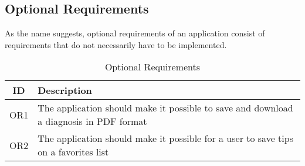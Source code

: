 \subsection{Optional Requirements}
As the name suggests, optional requirements of an application consist of requirements that do not necessarily have to be implemented.
\begin{table}[H]
	\begin{center}
		\scriptsize
		\def\arraystretch{2}%
		\begin{tabular}{ c|l }
			\hline
			\textbf{ID} & \textbf{Description}  \\
			\hline
			OR1 & The application should make it possible to save and download a diagnosis in PDF format  \\
			\hline
			OR2 & The application should make it possible for a user to save tips on a favorites list  \\
			\hline	
		\end{tabular}
		\normalsize
	\end{center}
	\caption{Optional Requirements}
\end{table}
